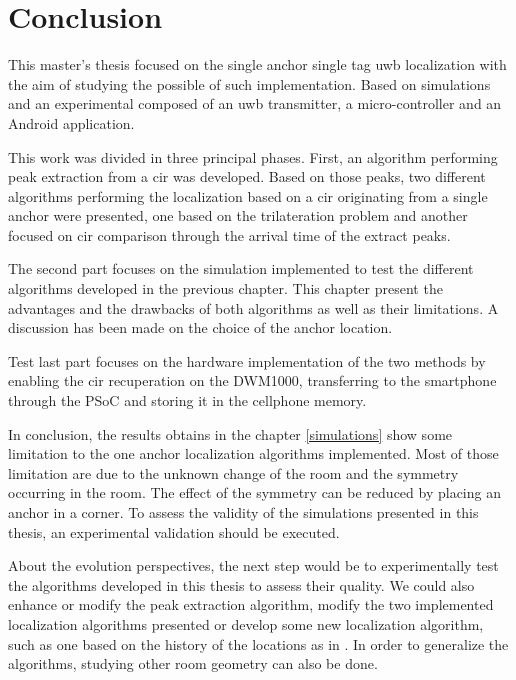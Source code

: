 \chapter{Conclusion}

This master's thesis focused on the single anchor single tag \gls{uwb} localization with the aim of studying the possible of such implementation. Based on simulations and an experimental composed of an \gls{uwb} transmitter, a micro-controller and an Android application.
\vspace{2mm}

This work was divided in three principal phases. First, an algorithm performing peak extraction from a \gls{cir} was developed. Based on those peaks, two different algorithms performing the localization based on a \gls{cir} originating from a single anchor were presented, one based on the trilateration problem and another focused on \gls{cir} comparison through the arrival time of the extract peaks.
\vspace{2mm}

The second part focuses on the simulation implemented to test the different algorithms developed in the previous chapter. This chapter present the advantages and the drawbacks of both algorithms as well as their limitations. A discussion has been made on the choice of the anchor location.
\vspace{2mm}

Test last part focuses on the hardware implementation of the two methods by enabling the \gls{cir} recuperation on the DWM1000, transferring to the smartphone through the PSoC and storing it in the cellphone memory. 
\vspace{2mm}

In conclusion, the results obtains in the chapter \ref{simulations} show some limitation to the one anchor localization algorithms implemented. Most of those limitation are due to the unknown change of the room and the symmetry occurring in the room. The effect of the symmetry can be reduced by placing an anchor in a corner. To assess the validity of the simulations presented in this thesis, an experimental validation should be executed. 
\vspace{2mm}

About the evolution perspectives, the next step would be to experimentally test the algorithms developed in this thesis to assess their quality. We could also enhance or modify the peak extraction algorithm, modify the two implemented localization algorithms presented or develop some new localization algorithm, such as one based on the history of the locations as in \cite{meissner2010uwb}. In order to generalize the algorithms, studying other room geometry can also be done.